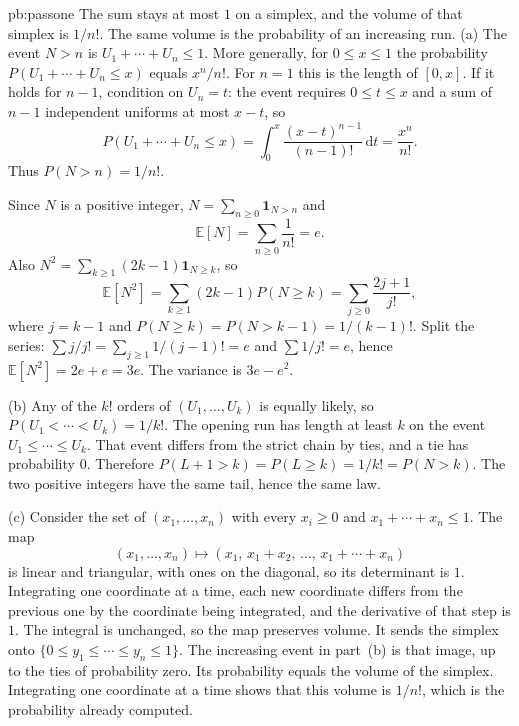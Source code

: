 \begin{solution}{pb:passone}
\idea The sum stays at most $1$ on a simplex, and the volume of that simplex is $1/n!$. The same volume is the probability of an increasing run.
\writeup (a) The event $N>n$ is $U_1+\cdots+U_n\le1$. More generally, for $0\le x\le1$ the probability $P(U_1+\cdots+U_n\le x)$ equals $x^n/n!$. For $n=1$ this is the length of $[0,x]$. If it holds for $n-1$, condition on $U_n=t$: the event requires $0\le t\le x$ and a sum of $n-1$ independent uniforms at most $x-t$, so
\[
 P(U_1+\cdots+U_n\le x)=\int_0^x\frac{(x-t)^{n-1}}{(n-1)!}\,\mathrm dt=\frac{x^n}{n!}.
\]
Thus $P(N>n)=1/n!$.

Since $N$ is a positive integer, $N=\sum_{n\ge0}\mathbf 1_{N>n}$ and
\[
 \mathbb E[N]=\sum_{n\ge0}\frac1{n!}=e.
\]
Also $N^2=\sum_{k\ge1}(2k-1)\mathbf 1_{N\ge k}$, so
\[
 \mathbb E[N^2]=\sum_{k\ge1}(2k-1)P(N\ge k)=\sum_{j\ge0}\frac{2j+1}{j!},
\]
where $j=k-1$ and $P(N\ge k)=P(N>k-1)=1/(k-1)!$. Split the series: $\sum j/j!=\sum_{j\ge1}1/(j-1)! =e$ and $\sum 1/j!=e$, hence $\mathbb E[N^2]=2e+e=3e$. The variance is $3e-e^2$.

(b) Any of the $k!$ orders of $(U_1,\ldots,U_k)$ is equally likely, so $P(U_1<\cdots<U_k)=1/k!$. The opening run has length at least $k$ on the event $U_1\le\cdots\le U_k$. That event differs from the strict chain by ties, and a tie has probability $0$. Therefore $P(L+1>k)=P(L\ge k)=1/k!=P(N>k)$. The two positive integers have the same tail, hence the same law.

(c) Consider the set of $(x_1,\ldots,x_n)$ with every $x_i\ge0$ and $x_1+\cdots+x_n\le1$. The map
\[
 (x_1,\ldots,x_n)\mapsto(x_1,\,x_1+x_2,\,\ldots,\,x_1+\cdots+x_n)
\]
is linear and triangular, with ones on the diagonal, so its determinant is $1$. Integrating one coordinate at a time, each new coordinate differs from the previous one by the coordinate being integrated, and the derivative of that step is $1$. The integral is unchanged, so the map preserves volume. It sends the simplex onto $\{0\le y_1\le\cdots\le y_n\le1\}$. The increasing event in part~(b) is that image, up to the ties of probability zero. Its probability equals the volume of the simplex. Integrating one coordinate at a time shows that this volume is $1/n!$, which is the probability already computed.
\end{solution}

